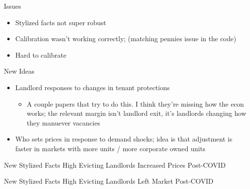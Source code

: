 \documentclass[10pt, xcolor=dvipsnames]{beamer}
\begin{document}
\begin{frame}{Issues}
    \begin{itemize}
        \item Stylized facts not super robust
        \item Calibration wasn't working correctly; (matching pennies issue in the code)
        \item Hard to calibrate
    \end{itemize}
    
\end{frame}

\begin{frame}{New Ideas}
    \begin{itemize}
        \item Landlord responses to changes in tenant protections
        \begin{itemize}
            \item A couple papers that try to do this. I think they're missing how the econ works; the relevant margin isn't landlord exit, it's landlords changing how they manuever vacancies
        \end{itemize}
        \item Who sets prices in response to demand shocks; idea is that adjustment is faster in markets with more units / more corporate owned units
    \end{itemize}
    
\end{frame}

\begin{frame}{New Stylized Facts}
    High Evicting Landlords Increased Prices Post-COVID
    \tiny
    
    
\end{frame}

\begin{frame}{New Stylized Facts}
    High Evicting Landlords Left Market Post-COVID
    \tiny
    
    
\end{frame}
\end{document}
